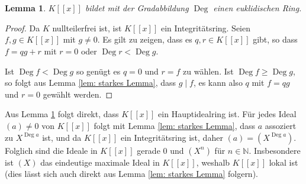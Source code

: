 \documentclass[a4paper,10pt]{article}
\newcounter{satze}
\newtheorem{lem}[satze]{Lemma}
\theoremstyle{definition}
\newcommand{\N}{\mathbb{N}}
\newcommand{\Deg}{\operatorname{Deg}}
\begin{document}
\section{}
\begin{lem}\label{lem: K[[x]] euklidisch}
 $K[\![x]\!]$ bildet mit der Gradabbildung $\Deg$ einen euklidischen Ring.
\end{lem}
\begin{proof}
 Da $K$ nullteilerfrei ist, ist $K[\![x]\!]$ ein Integritätsring. Seien $f,g \in K[\![x]\!]$ mit $g \neq 0$. Es gilt zu zeigen, dass es $q,r \in K[\![x]\!]$ gibt, so dass $f = qg + r$ mit $r = 0$ oder $\Deg r < \Deg g$.
 
 Ist $\Deg f < \Deg g$ so genügt es $q=0$ und $r=f$ zu wählen. Ist $\Deg f \geq \Deg g$, so folgt aus Lemma \ref{lem: starkes Lemma}, dass $g \mid f$, es kann also $q$ mit $f = qg$ und $r=0$ gewählt werden.
\end{proof}

Aus Lemma \ref{lem: K[[x]] euklidisch} folgt direkt, dass $K[\![x]\!]$ ein Hauptidealring ist. Für jedes Ideal $(a) \neq 0$ von $K[\![x]\!]$ folgt mit Lemma \ref{lem: starkes Lemma}, dass $a$ assoziert zu $X^{\Deg a}$ ist, und da $K[\![x]\!]$ ein Integritätsring ist, daher $(a) = \left(X^{\Deg a}\right)$. Folglich sind die Ideale in $K[\![x]\!]$ gerade $0$ und $\left(X^n\right)$ für $n \in \N$. Insbesondere ist $(X)$ das eindeutige maximale Ideal in $K[\![x]\!]$, weshalb $K[\![x]\!]$ lokal ist (dies lässt sich auch direkt aus Lemma \ref{lem: starkes Lemma} folgern).
\end{document}
